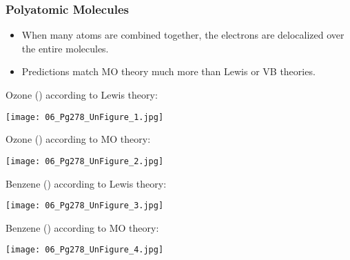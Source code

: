 \documentclass[notes=only]{beamer}
\begin{document}
\clearpage

\begin{frame}[c,allowframebreaks]
	\frametitle{Polyatomic Molecules}
	\begin{itemize}
		\item When many atoms are combined together, the electrons are
			\alert{delocalized} over the entire molecules.
		\item Predictions match MO theory much more than Lewis or VB
			theories.
	\end{itemize}

	\bigskip

	Ozone () according to Lewis theory:

	\begin{center}	
		\texttt{[image: 06\_Pg278\_UnFigure\_1.jpg]}
	\end{center}

	\framebreak

	Ozone () according to MO theory:
	\begin{center}	
		\texttt{[image: 06\_Pg278\_UnFigure\_2.jpg]}
	\end{center}

	\framebreak

	Benzene () according to Lewis theory:
	\begin{center}
		\texttt{[image: 06\_Pg278\_UnFigure\_3.jpg]}
	\end{center}

	\framebreak

	Benzene () according to MO theory:
	\begin{center}
		\texttt{[image: 06\_Pg278\_UnFigure\_4.jpg]}
	\end{center}
\end{frame}
\end{document}
